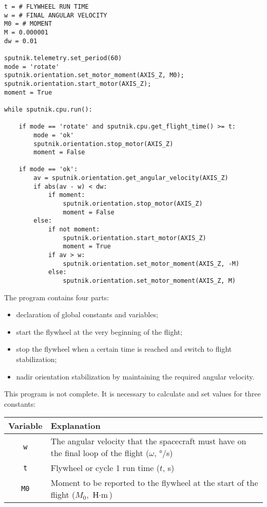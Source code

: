 \documentclass[12pt,a4paper]{article}
\begin{document}
\begin{verbatim}
t = # FLYWHEEL RUN TIME
w = # FINAL ANGULAR VELOCITY
M0 = # MOMENT
M = 0.000001
dw = 0.01

sputnik.telemetry.set_period(60)
mode = 'rotate'
sputnik.orientation.set_motor_moment(AXIS_Z, M0);
sputnik.orientation.start_motor(AXIS_Z);
moment = True

while sputnik.cpu.run():

    if mode == 'rotate' and sputnik.cpu.get_flight_time() >= t:
        mode = 'ok'
        sputnik.orientation.stop_motor(AXIS_Z)
        moment = False

    if mode == 'ok':
        av = sputnik.orientation.get_angular_velocity(AXIS_Z)
        if abs(av - w) < dw:
            if moment:
                sputnik.orientation.stop_motor(AXIS_Z)
                moment = False
        else:
            if not moment:
                sputnik.orientation.start_motor(AXIS_Z)
                moment = True
            if av > w:
                sputnik.orientation.set_motor_moment(AXIS_Z, -M)
            else:
                sputnik.orientation.set_motor_moment(AXIS_Z, M)
\end{verbatim}

The program contains four parts:

\begin{itemize}
\item declaration of global constants and variables;
\item start the flywheel at the very beginning of the flight;
\item stop the flywheel when a certain time is reached and switch to flight stabilization;
\item nadir orientation stabilization by maintaining the required angular velocity.
\end{itemize}

This program is not complete. It is necessary to calculate and set values for three constants:

\begin{center}
\begin{tabular}{ |c|p{12cm}|}
  \hline
  \textbf{Variable} & \textbf{Explanation} \\
  \hline
  \verb'w' & The angular velocity that the spacecraft must have on the final loop of the flight
  ($\omega$, °/s)\\
  \hline
  \verb't' & Flywheel or cycle 1 run time ($t$, s)\\
  \hline
  \verb'M0' & Moment to be reported to the flywheel at the start of the flight ($M_0$, $\text{Н}
  \cdot \text{m}$)\\
  \hline
\end{tabular}
\end{center}
\end{document}
